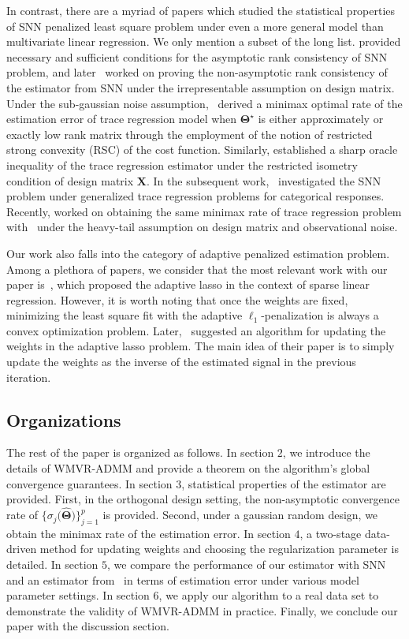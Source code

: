 \documentclass[12pt]{article}
\begin{document}
In contrast, there are a myriad of papers which studied the statistical properties of SNN penalized least square problem under even a more general model than multivariate linear regression.
We only mention a subset of the long list.
\citet{bach2008consistency} provided necessary and sufficient conditions for the asymptotic rank consistency of SNN problem, and later~\citet{lee2015model} worked on proving the non-asymptotic rank consistency of the estimator from SNN under the irrepresentable assumption on design matrix.
Under the sub-gaussian noise assumption,~\citet{negahban2011estimation} derived a minimax optimal rate of the estimation error of trace regression model when $\boldsymbol{\Theta}^{\star}$ is either approximately or exactly low rank matrix through the employment of the notion of restricted strong convexity (RSC) of the cost function.
Similarly, \citet{koltchinskii2011nuclear} established a sharp oracle inequality of the trace regression estimator under the restricted isometry condition of design matrix $\boldsymbol{X}$.
In the subsequent work,~\citet{fan2019generalized} investigated the SNN problem under generalized trace regression problems for categorical responses.
Recently, \citet{fan2021shrinkage} worked on obtaining the same minimax rate of trace regression problem with~\citet{negahban2011estimation} under the heavy-tail assumption on design matrix and observational noise.

Our work also falls into the category of adaptive penalized estimation problem.
Among a plethora of papers, we consider that the most relevant work with our paper is~\citet{zou2006adaptive}, which proposed the adaptive lasso in the context of sparse linear regression.
However, it is worth noting that once the weights are fixed, minimizing the least square fit with the adaptive $\ell_{1}$-penalization is always a convex optimization problem. 
Later,~\citet{candes2008enhancing} suggested an algorithm for updating the weights in the adaptive lasso problem.
The main idea of their paper is to simply update the weights as the inverse of the estimated signal in the previous iteration.

\subsection{Organizations}
The rest of the paper is organized as follows.
In section $2$, we introduce the details of WMVR-ADMM and provide a theorem on the algorithm's global convergence guarantees.
In section $3$, statistical properties of the estimator are provided.  
First, in the orthogonal design setting, the non-asymptotic convergence rate of $\{\sigma_{j}\big(\widehat{\boldsymbol{\Theta}}\big)\}_{j=1}^{p}$ is provided. 
Second, under a gaussian random design, we obtain the minimax rate of the estimation error.
In section $4$, a two-stage data-driven method for updating weights and choosing the regularization parameter is detailed.
In section $5$, we compare the performance of our estimator with SNN and an estimator from~\citet{chen2013reduced} in terms of estimation error under various model parameter settings.
In section $6$, we apply our algorithm to a real data set to demonstrate the validity of WMVR-ADMM in practice.
Finally, we conclude our paper with the discussion section. 
\end{document}
